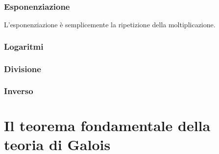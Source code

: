 
\subsubsection{Esponenziazione} %

\textsf{\small L'esponenziazione è semplicemente la ripetizione della moltiplicazione.}




\subsubsection{Logaritmi}



\subsubsection{Divisione}

\textsf{\small }

\subsubsection{Inverso} %

\textsf{\small }


\section{Il teorema fondamentale della teoria di Galois} %
\textsf{\small } 

